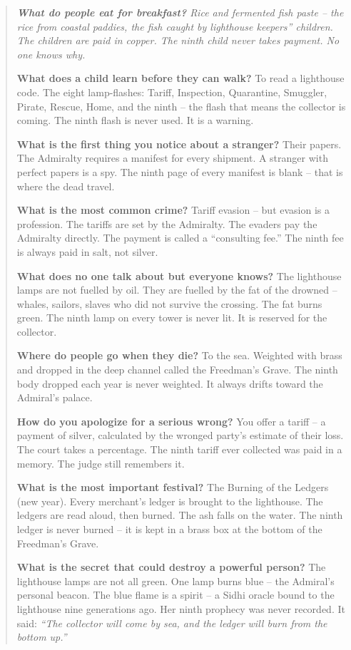 \documentclass[12pt,oneside]{book}
\newenvironment{almanac}
  {\begin{quote}\small\itshape}
  {\end{quote}}
\begin{document}
\vspace{1em}
\begin{almanac}
\textbf{What do people eat for breakfast?} Rice and fermented fish paste -- the rice from coastal paddies, the fish caught by lighthouse keepers'' children. The children are paid in copper. The ninth child never takes payment. No one knows why.

\textbf{What does a child learn before they can walk?} To read a lighthouse code. The eight lamp-flashes: Tariff, Inspection, Quarantine, Smuggler, Pirate, Rescue, Home, and the ninth -- the flash that means the collector is coming. The ninth flash is never used. It is a warning.

\textbf{What is the first thing you notice about a stranger?} Their papers. The Admiralty requires a manifest for every shipment. A stranger with perfect papers is a spy. The ninth page of every manifest is blank -- that is where the dead travel.

\textbf{What is the most common crime?} Tariff evasion -- but evasion is a profession. The tariffs are set by the Admiralty. The evaders pay the Admiralty directly. The payment is called a ``consulting fee.'' The ninth fee is always paid in salt, not silver.

\textbf{What does no one talk about but everyone knows?} The lighthouse lamps are not fuelled by oil. They are fuelled by the fat of the drowned -- whales, sailors, slaves who did not survive the crossing. The fat burns green. The ninth lamp on every tower is never lit. It is reserved for the collector.

\textbf{Where do people go when they die?} To the sea. Weighted with brass and dropped in the deep channel called the Freedman's Grave. The ninth body dropped each year is never weighted. It always drifts toward the Admiral's palace.

\textbf{How do you apologize for a serious wrong?} You offer a tariff -- a payment of silver, calculated by the wronged party's estimate of their loss. The court takes a percentage. The ninth tariff ever collected was paid in a memory. The judge still remembers it.

\textbf{What is the most important festival?} The Burning of the Ledgers (new year). Every merchant's ledger is brought to the lighthouse. The ledgers are read aloud, then burned. The ash falls on the water. The ninth ledger is never burned -- it is kept in a brass box at the bottom of the Freedman's Grave.

\textbf{What is the secret that could destroy a powerful person?} The lighthouse lamps are not all green. One lamp burns blue -- the Admiral's personal beacon. The blue flame is a spirit -- a Sidhi oracle bound to the lighthouse nine generations ago. Her ninth prophecy was never recorded. It said: \textit{``The collector will come by sea, and the ledger will burn from the bottom up.''}
\end{almanac}
\end{document}
